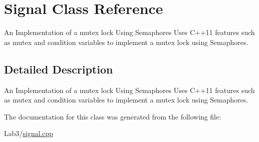 \hypertarget{class_signal}{}\section{Signal Class Reference}
\label{class_signal}


An Implementation of a mutex lock Using Semaphores Uses C++11 features such as mutex and condition variables to implement a mutex lock using Semaphores.  




\subsection{Detailed Description}
An Implementation of a mutex lock Using Semaphores Uses C++11 features such as mutex and condition variables to implement a mutex lock using Semaphores. 

The documentation for this class was generated from the following file\+:\begin{DoxyCompactItemize}
\item 
Lab3/\hyperlink{signal_8cpp}{signal.\+cpp}\end{DoxyCompactItemize}

